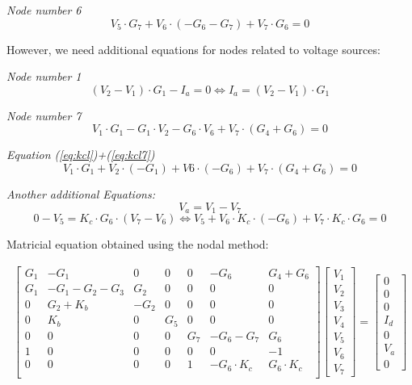 \textit{Node number 6}
\begin{equation}
 	V_5 \cdot G_7 + V_6\cdot (-G_6 -G_7) + V_7 \cdot G_6 =0
  \label{eq:kcl6}
\end{equation}

However, we need additional equations for nodes related to voltage sources:

\textit{Node number 1}
\begin{equation}
  (V_2 - V_1)\cdot G_1 -I_a =0 \Leftrightarrow I_a=(V_2 - V_1)\cdot G_1
  \label{eq:kcl}
\end{equation}

\textit{Node number 7}
\begin{equation}
  V_1 \cdot G_1 - G_1 \cdot V_2 - G_6 \cdot V_6 + V_7 \cdot (G_4 + G_6)=0
  \label{eq:kcl7}
\end{equation}

\textit{Equation (\ref{eq:kcl})+(\ref{eq:kcl7})}
\begin{equation}
  V_1\cdot G_1+V_2\cdot (-G_1)+V6\cdot (-G_6)+V_7\cdot (G_4+G_6)=0
  \label{eq:kcl17}
\end{equation}

\textit{Another additional Equations:}
\begin{equation}
  V_a=V_1-V_7
  \label{eq:kcl8}
\end{equation}
\begin{equation}
  0-V_5=K_c\cdot G_6\cdot (V_7-V_6) \Leftrightarrow V_5+V_6\cdot K_c\cdot (-G_6)+V_7\cdot K_c\cdot G_6=0
  \label{eq:kcl9}
\end{equation}

Matricial equation obtained using the nodal method:

\begin{gather}
	\begin{bmatrix}
		G_1 & -G_1 & 0 & 0 & 0 & -G_6 & G_4 + G_6 \\
		G_1 & -G_1 - G_2 - G_3 & G_2 & 0 & 0 & 0 & 0 \\
		0 & G_2 + K_b & -G_2 & 0 & 0 & 0 & 0 \\
		0 & K_b & 0 & G_5 & 0 & 0 & 0 \\
		0 & 0 & 0 & 0 & G_7 & -G_6 - G_7 & G_6 \\
		1 & 0 & 0 & 0 & 0 & 0 & -1 \\
		0 & 0 & 0 & 0 & 1 & -G_6\cdot K_c & G_6\cdot K_c \\
	\end{bmatrix}
	\begin {bmatrix} V_1 \\ V_2 \\ V_3 \\ V_4  \\ V_5 \\ V_6 \\ V_7 \end{bmatrix}
	=
	\begin {bmatrix} 0  \\ 0  \\ 0  \\ I_d \\ 0  \\ V_a \\ 0 \end{bmatrix}
\end{gather}

